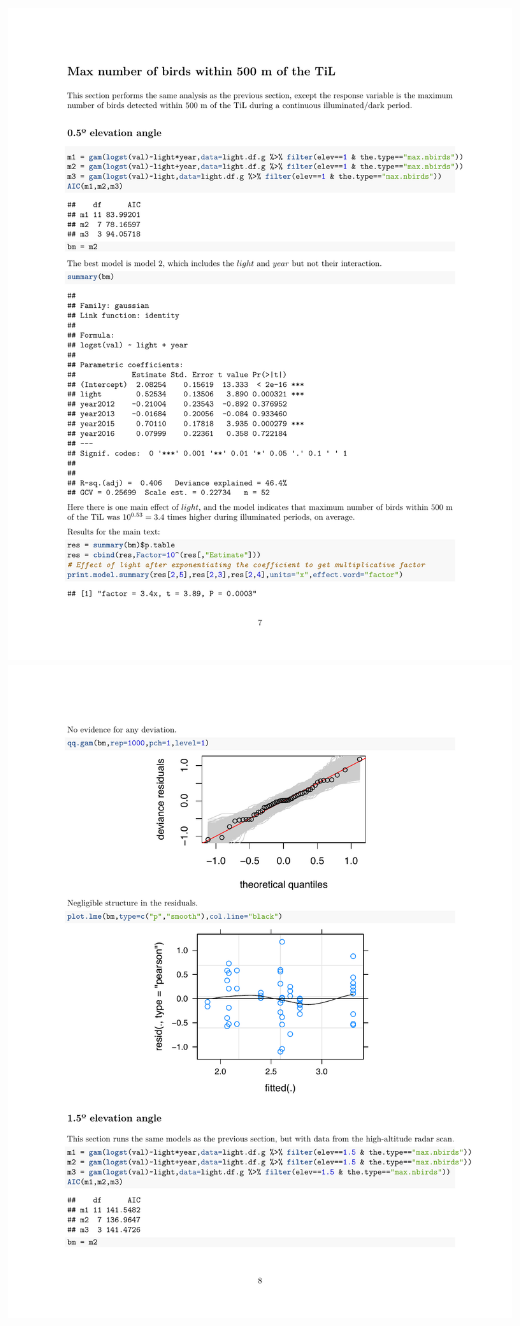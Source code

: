 \documentclass[a4paper, twoside]{templates/ociamthesis}
\begin{document}
\includegraphics[width=1\linewidth]{pdf_chapters/lights/lights_supp_crop_Part41}
\includegraphics[width=1\linewidth]{pdf_chapters/lights/lights_supp_crop_Part42}
\end{document}
